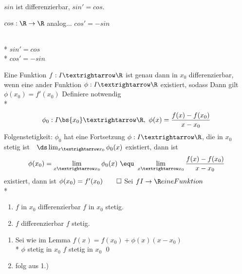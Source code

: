 {{\Rarr{} $sin$ ist differenzierbar, $sin' = cos$.}
\item{$cos: \R \to \R$ analog... $cos' = -sin$\\
\\*
$sin' = cos$\\*
$cos' = -sin$}
}

Eine Funktion $f:I→\R$ ist genau dann in $x_0$ differenzierbar, wenn eine ander Funktion $\phi:I→\R$ existiert, sodass
Dann gilt $\phi(x_0) =f'(x_0)$
\bew
Definiere notwendig\\*
$$\phi_0:I\bs\{x_0\}→\R,\ \phi(x)=\frac{f(x)-f(x_0)}{x-x_0}$$
Folgenstetigkeit: $ \phi_0$ hat eine Fortsetzung $\phi:I→\R$, die in $x_0$ stetig ist\ \equ\ $\ds\lim_{x→x_0}\phi_0(x)$ existiert, dann ist 
$$\phi(x_0)=\lim_{x→x_0}\phi_0(x)\ \equ\ \lim_{x→x_0}\frac{f(x)-f(x_0)}{x-x_0}$$
existiert, dann ist $\phi(x_0)=f'(x_0)\qed$
Sei $f I \to \R eine Funktion$\\*
\begin{enumerate}
\item{$f$ in $x_0$ differenzierbar \Rarr{} $f$ in $x_0$ stetig.}
\item{$f$ differenzierbar \Rarr{} $f$ stetig.}
\end{enumerate}
\bew
\begin{enumerate}
\item{Sei \phi wie im Lemma \Rarr{} $f(x) = f(x_0) + \phi(x)(x-x_0)$\\*
$\phi$ stetig in $x_0$ \Rarr{} $f$ stetig in $x_0$ \qed}
\item{folg aus 1.)}
\end{enumerate}

